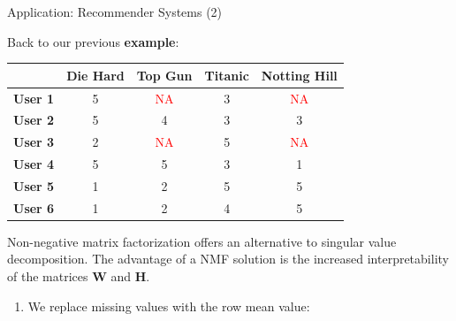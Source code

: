 \documentclass[11pt,compress,t,notes=noshow, xcolor=table]{beamer}
\begin{document}
\begin{vbframe}{Application: Recommender Systems (2)}

Back to our previous \textbf{example}:

\begin{footnotesize}
\begin{center}
\begin{table}[h!]
    \centering
    \begin{tabular}{|l|c|c|c|c|}
    \hline
           & \textbf{Die Hard} & \textbf{Top Gun} & \textbf{Titanic} & \textbf{Notting Hill} \\ \hline
    \textbf{User 1} & 5 & \textcolor{red}{NA} & 3 & \textcolor{red}{NA} \\ \hline
    \textbf{User 2} & 5 & 4 & 3 & 3 \\ \hline
    \textbf{User 3} & 2 & \textcolor{red}{NA} & 5 & \textcolor{red}{NA} \\ \hline
    \textbf{User 4} & 5 & 5 & 3 & 1 \\ \hline
    \textbf{User 5} & 1 & 2 & 5 & 5 \\ \hline
    \textbf{User 6} & 1 & 2 & 4 & 5 \\ \hline
    \end{tabular}
\end{table}
    
\end{center}
\end{footnotesize}

Non-negative matrix factorization offers an alternative to singular value decomposition. The advantage of a NMF solution is the increased interpretability of the matrices $\mathbf{W}$ and $\mathbf{H}$.

\framebreak

\begin{enumerate}
\item We replace missing values with the row mean value:







\end{enumerate}
\end{vbframe}
\end{document}
